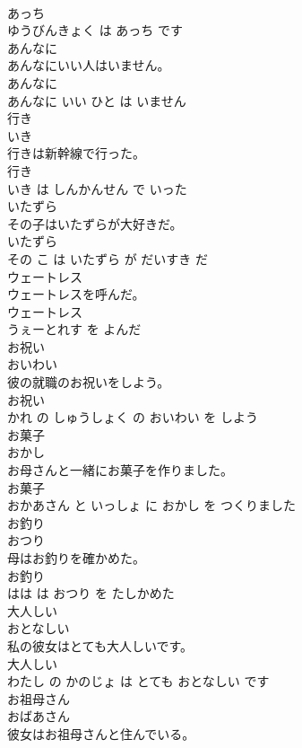 \documentclass[8pt]{extreport}
\begin{document}
\begin{CJK}{UTF8}{min}
\\	あっち 
\\	ゆうびんきょく は あっち です			
\\	あんなに	
\\	あんなにいい人はいません。	
\\	あんなに 
\\	あんなに いい ひと は いません			
\\	行き	
\\	いき			
\\	行きは新幹線で行った。	
\\	行き 
\\	いき は しんかんせん で いった			
\\	いたずら	
\\	その子はいたずらが大好きだ。	
\\	いたずら 
\\	その こ は いたずら が だいすき だ			
\\	ウェートレス	
\\	ウェートレスを呼んだ。	
\\	ウェートレス 
\\	うぇーとれす を よんだ			
\\	お祝い	
\\	おいわい			
\\	彼の就職のお祝いをしよう。	
\\	お祝い 
\\	かれ の しゅうしょく の おいわい を しよう			
\\	お菓子	
\\	おかし			
\\	お母さんと一緒にお菓子を作りました。	
\\	お菓子 
\\	おかあさん と いっしょ に おかし を つくりました			
\\	お釣り	
\\	おつり			
\\	母はお釣りを確かめた。	
\\	お釣り 
\\	はは は おつり を たしかめた			
\\	大人しい	
\\	おとなしい			
\\	私の彼女はとても大人しいです。	
\\	大人しい 
\\	わたし の かのじょ は とても おとなしい です			
\\	お祖母さん	
\\	おばあさん			
\\	彼女はお祖母さんと住んでいる。	

\end{CJK}
\end{document}
